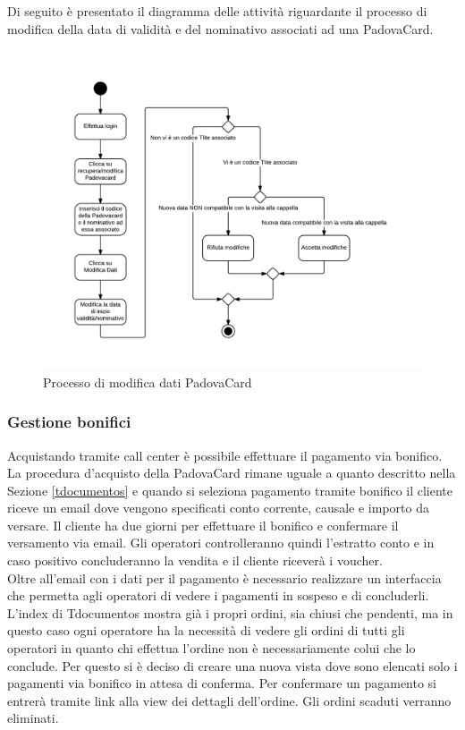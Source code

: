 Di seguito è presentato il diagramma delle attività riguardante il processo di modifica della data di validità e del nominativo associati ad una PadovaCard.
\begin{figure}[H]
\centering
\includegraphics[width=1\textwidth]{images/modifica_padovacard.png}
\caption{Processo di modifica dati PadovaCard}
\end{figure}

\subsubsection{Gestione bonifici}
Acquistando tramite call center è possibile effettuare il pagamento via bonifico.
La procedura d'acquisto della PadovaCard rimane uguale a quanto descritto nella Sezione \ref{tdocumentos} e quando si seleziona pagamento tramite bonifico il cliente riceve un email dove vengono specificati conto corrente, causale e importo da versare. Il cliente ha due giorni per effettuare il bonifico e confermare il versamento via email. Gli operatori controlleranno quindi l'estratto conto e in caso positivo concluderanno la vendita e il cliente riceverà i voucher. \\

Oltre all'email con i dati per il pagamento è necessario realizzare un interfaccia che permetta agli operatori di vedere i pagamenti in sospeso e di concluderli. L'index di Tdocumentos mostra già i propri ordini, sia chiusi che pendenti, ma in questo caso ogni operatore ha la necessità di vedere gli ordini di tutti gli operatori in quanto chi effettua l'ordine non è necessariamente colui che lo conclude. Per questo si è deciso di creare una nuova vista dove sono elencati solo i pagamenti via bonifico in attesa di conferma. Per confermare un pagamento si entrerà tramite link alla view dei dettagli dell'ordine. Gli ordini scaduti verranno eliminati.

